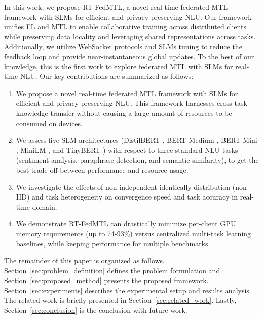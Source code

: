 In this work, we propose RT-FedMTL, a novel real-time federated MTL framework with SLMs for efficient and privacy-preserving NLU. Our framework unifies FL and MTL to enable collaborative training across distributed clients while preserving data locality and leveraging shared representations across tasks. Additionally, we utilize WebSocket protocols and SLMs tuning to reduce the feedback loop and provide near-instantaneous global updates. To the best of our knowledge, this is the first work to explore federated MTL with SLMs for real-time NLU. 
Our key contributions are summarized as follows:
 \begin{enumerate}
     \item We propose a novel real-time federated MTL framework with SLMs for efficient and privacy-preserving NLU. This framework harnesses cross-task knowledge transfer without causing a large amount of resources to be consumed on devices.
     \item We assess five SLM architectures (DistilBERT \cite{sanh2019distilbert}, BERT-Medium \cite{turc2019well}, BERT-Mini \cite{turc2019well}, MiniLM \cite{wang2020minilm}, and TinyBERT \cite{jiao2019tinybert}) with respect to three standard NLU tasks (sentiment analysis, paraphrase detection, and semantic similarity), to get the best trade-off between performance and resource usage.
     \item We investigate the effects of non-independent identically distribution (non-IID) and task heterogeneity on convergence speed and task accuracy in real-time domain.
     \item We demonstrate RT-FedMTL can drastically minimize per-client GPU memory requirements (up to 74-93\%) versus centralized multi-task learning baselines, while keeping performance for multiple benchmarks.
 \end{enumerate}

The remainder of this paper is organized as follows. Section~\ref{sec:problem_definition} defines the problem formulation and Section~\ref{sec:proposed_method} presents the proposed framework. Section~\ref{sec:experiments} describes the experimental setup and results analysis. The related work is briefly presented in Section~\ref{sec:related_work}. Lastly, Section~\ref{sec:conclusion} is the conclusion with future work.